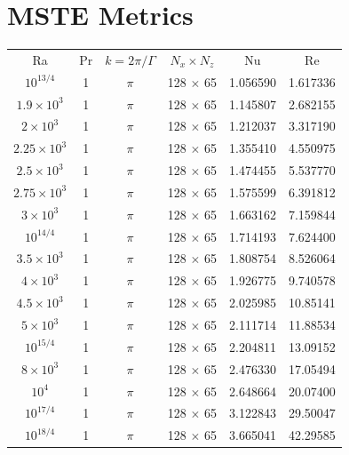 \documentclass[reprint,amsmath,amssymb,aps]{revtex4-1}
\begin{document}
\section{MSTE Metrics}\label{sec:tables}
\begin{longtable*}{cccccc}
    \quad\quad\quad Ra	\quad\quad\quad	&	\quad\quad\quad		Pr	\quad\quad\quad		&	\quad\quad\quad		$k=2\pi/\Gamma$	\quad\quad\quad		&	\quad\quad\quad		$N_x \times N_z$	\quad\quad\quad		&	\quad\quad\quad		Nu	\quad\quad\quad		&	\quad\quad\quad		Re	\quad\quad\quad\\
    $10^{13/4}$	&	1	&	$\pi$	&	128 $\times$ 65	&	1.056590	&	1.617336\\
    $1.9\times10^3$	&	1	&	$\pi$	&	128 $\times$ 65	&	1.145807	&	2.682155\\
    $2\times10^3$	&	1	&	$\pi$	&	128 $\times$ 65	&	1.212037	&	3.317190\\
    $2.25\times10^3$	&	1	&	$\pi$	&	128 $\times$ 65	&	1.355410	&	4.550975\\
    $2.5\times10^3$	&	1	&	$\pi$	&	128 $\times$ 65	&	1.474455	&	5.537770\\
    $2.75\times10^3$	&	1	&	$\pi$	&	128 $\times$ 65	&	1.575599	&	6.391812\\
    $3\times10^3$	&	1	&	$\pi$	&	128 $\times$ 65	&	1.663162	&	7.159844\\
    $10^{14/4}$	&	1	&	$\pi$	&	128 $\times$ 65	&	1.714193	&	7.624400\\
    $3.5\times10^3$	&	1	&	$\pi$	&	128 $\times$ 65	&	1.808754	&	8.526064\\
    $4\times10^3$	&	1	&	$\pi$	&	128 $\times$ 65	&	1.926775	&	9.740578\\
    $4.5\times10^3$	&	1	&	$\pi$	&	128 $\times$ 65	&	2.025985	&	10.85141\\
    $5\times10^3$	&	1	&	$\pi$	&	128 $\times$ 65	&	2.111714	&	11.88534\\
    $10^{15/4}$	&	1	&	$\pi$	&	128 $\times$ 65	&	2.204811	&	13.09152\\
    $8\times10^3$	&	1	&	$\pi$	&	128 $\times$ 65	&	2.476330	&	17.05494\\
    $10^4$	&	1	&	$\pi$	&	128 $\times$ 65	&	2.648664	&	20.07400\\
    $10^{17/4}$	&	1	&	$\pi$	&	128 $\times$ 65	&	3.122843	&	29.50047\\
    $10^{18/4}$	&	1	&	$\pi$	&	128 $\times$ 65	&	3.665041	&	42.29585\\

\end{longtable*}
\end{document}
